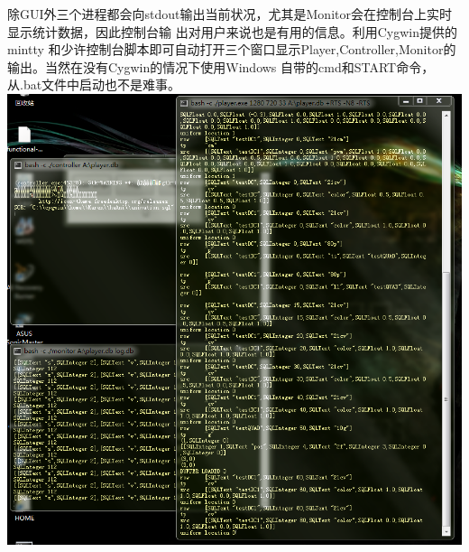 \documentclass[12pt,a4paper]{article}
\begin{document}
\vspace{10mm}
除GUI外三个进程都会向stdout输出当前状况，尤其是Monitor会在控制台上实时显示统计数据，因此控制台输%
出对用户来说也是有用的信息。利用Cygwin提供的mintty%
和少许控制台脚本即可自动打开三个窗口显示Player,Controller,Monitor的输出。当然在没有Cygwin的情况下使用Windows%
自带的cmd和START命令，从.bat文件中启动也不是难事。\\
\vspace{5mm}\noindent\includegraphics[width=\textwidth]{p3.png}\vspace{10mm}

\end{document}

